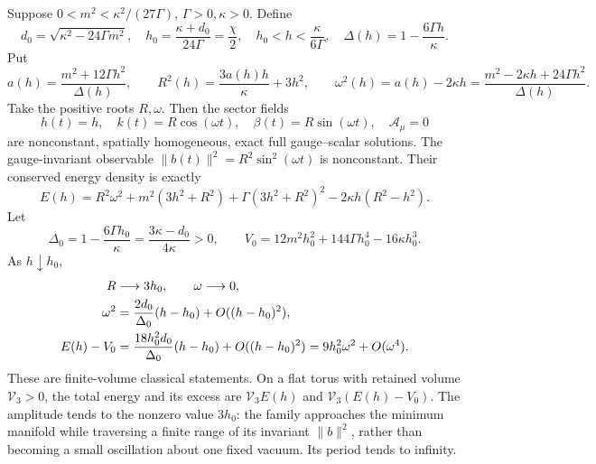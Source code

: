 \begin{theorem}
\label{q444:vk-periodic}
Suppose \(0<m^2<\kappa^2/(27\Gamma)\), \(\Gamma>0,\kappa>0\).
Define
\[
 d_0=\sqrt{\kappa^2-24\Gamma m^2},\quad
 h_0=\frac{\kappa+d_0}{24\Gamma}=\frac{\chi}{2},\quad
 h_0<h<\frac{\kappa}{6\Gamma},\quad
 \Delta(h)=1-\frac{6\Gamma h}{\kappa}.
\]
Put
\[
 a(h)=\frac{m^2+12\Gamma h^2}{\Delta(h)},\qquad
 R^2(h)=\frac{3a(h)h}{\kappa}+3h^2,\qquad
 \omega^2(h)=a(h)-2\kappa h
   =\frac{m^2-2\kappa h+24\Gamma h^2}{\Delta(h)}.
\]
Take the positive roots \(R,\omega\). Then the sector fields
\[
 h(t)=h,\quad k(t)=R\cos(\omega t),\quad
 \beta(t)=R\sin(\omega t),\quad \mathcal A_\mu=0
\]
are nonconstant, spatially homogeneous, exact full gauge--scalar
solutions. The gauge-invariant observable
\(\|b(t)\|^2=R^2\sin^2(\omega t)\) is nonconstant.
Their conserved energy density is exactly
\begin{equation}\label{q444:vk-periodic-energy}
 E(h)=R^2\omega^2+
 m^2(3h^2+R^2)+\Gamma(3h^2+R^2)^2-2\kappa h(R^2-h^2).
\end{equation}
Let
\[
 \Delta_0=1-\frac{6\Gamma h_0}{\kappa}
          =\frac{3\kappa-d_0}{4\kappa}>0,\qquad
 V_0=12m^2h_0^2+144\Gamma h_0^4-16\kappa h_0^3 .
\]
As \(h\downarrow h_0\),
\begin{align}
 R&\longrightarrow3h_0,\qquad \omega\longrightarrow0,\notag\\
 \omega^2&=\frac{2d_0}{\Delta_0}(h-h_0)
                            +O((h-h_0)^2),\notag\\
 E(h)-V_0&=\frac{18h_0^2d_0}{\Delta_0}(h-h_0)
                            +O((h-h_0)^2)
          =9h_0^2\omega^2+O(\omega^4).\label{q444:vk-excess}
\end{align}
These are finite-volume classical statements. On a flat torus with
retained volume \(\mathcal V_3>0\), the total energy and its excess are
\(\mathcal V_3 E(h)\) and \(\mathcal V_3(E(h)-V_0)\).
The amplitude tends to the nonzero value \(3h_0\): the family approaches
the minimum manifold while traversing a finite range of its invariant
\(\|b\|^2\), rather than becoming a small oscillation about one fixed
vacuum. Its period tends to infinity.
\end{theorem}
